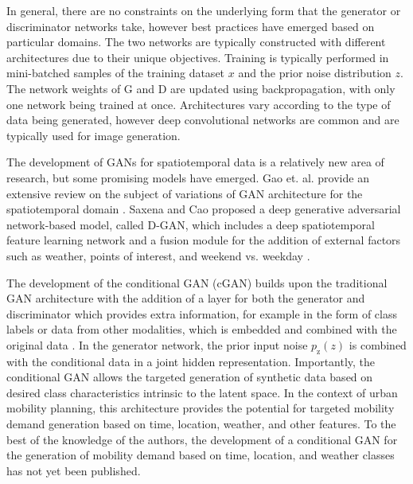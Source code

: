\documentclass[conference]{IEEEtran}
\begin{document}
In general, there are no constraints on the underlying form that the generator or discriminator networks take, 
however best practices have emerged based on particular domains. The two networks are typically constructed with 
different architectures due to their unique objectives. Training is typically performed in mini-batched samples 
of the training dataset $x$ and the prior noise distribution $z$. The network weights of G and D are updated using
backpropagation, with only one network being trained at once. Architectures vary according to the type of data
being generated, however deep convolutional networks are common and are typically used for image generation.

The development of GANs for spatiotemporal data is a relatively new area of research, but some promising models 
have emerged.  Gao et. al. provide an extensive review on the subject of variations of GAN architecture for the 
spatiotemporal domain \cite{gao_generative_2022}. Saxena and Cao proposed a deep generative adversarial network-based model, 
called D-GAN, which includes a deep spatiotemporal feature learning network and a fusion module for the addition 
of external factors such as weather, points of interest, and weekend vs. weekday \cite{DBLP:journals/corr/abs-1907-08556}.

The development of the conditional GAN (cGAN) builds upon the traditional GAN architecture with the addition 
of a layer for both the generator and discriminator which provides extra information, for example in the form 
of class labels or data from other modalities, which is embedded and combined with the original data \cite{mirza_conditional_2014}. 
In the generator network, the prior input noise $p_{\text{z}}(z)$ is combined with the conditional data in a joint hidden 
representation. Importantly, the conditional GAN allows the targeted generation of synthetic data based on desired 
class characteristics intrinsic to the latent space. In the context of urban mobility planning, this architecture
provides the potential for targeted mobility demand generation based on time, location, weather, and other features.
To the best of the knowledge of the authors, the development of a conditional GAN for the generation of mobility
demand based on time, location, and weather classes has not yet been published.
\end{document}
